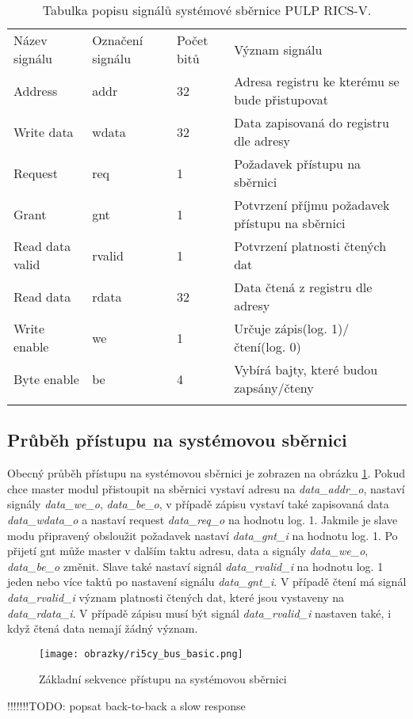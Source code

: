 \begin{table}[H]
	\FloatBarrier
  \caption{Tabulka popisu signálů systémové sběrnice PULP RICS-V. \cite{ri5cy}}
  \begin{center}
  	\small
	  \begin{tabular}{!{\vrule width 1.2pt}M{2.2cm}|M{1.5cm}|M{1.8cm}|M{7cm}!{\vrule width 1.2pt}}
	    Název signálu & Označení signálu & Počet bitů & Význam signálu\\
	    Address & addr & 32 & Adresa registru ke kterému se bude přistupovat\\
			\hline
			Write data & wdata & 32 & Data zapisovaná do registru dle adresy\\
			\hline
			Request & req & 1 & Požadavek přístupu na sběrnici\\
			\hline
			Grant & gnt & 1 & Potvrzení příjmu požadavek přístupu na sběrnici\\
			\hline			
			Read data valid & rvalid & 1 & Potvrzení platnosti čtených dat\\
			\hline
			Read data & rdata & 32 & Data čtená z registru dle adresy\\
			\hline
			Write enable & we & 1 & Určuje zápis(log. 1)/čtení(log. 0)\\
			\hline
			Byte enable & be & 4 & Vybírá bajty, které budou zapsány/čteny\\
			\hline
		\end{tabular}
  \end{center}
	\label{tab:ri5cy_bus}
\end{table}

\subsection{Průběh přístupu na systémovou sběrnici}
Obecný průběh přístupu na systémovou sběrnici je zobrazen na obrázku \ref{fig:ri5cy_bus_basic}. Pokud chce master modul přistoupit na sběrnici vystaví adresu na \textit{data\_addr\_o}, nastaví signály \textit{data\_we\_o}, \textit{data\_be\_o}, v případě zápisu vystaví také zapisovaná data \textit{data\_wdata\_o} a nastaví request \textit{data\_req\_o} na hodnotu log. 1. Jakmile je slave modu připravený obsloužit požadavek nastaví \textit{data\_gnt\_i} na hodnotu log. 1. Po přijetí gnt může master v dalším taktu adresu, data a signály \textit{data\_we\_o}, \textit{data\_be\_o} změnit. Slave také nastaví signál \textit{data\_rvalid\_i} na hodnotu log. 1 jeden nebo více taktů po nastavení signálu \textit{data\_gnt\_i}. V případě čtení má signál \textit{data\_rvalid\_i} význam platnosti čtených dat, které jsou vystaveny na \textit{data\_rdata\_i}. V případě zápisu musí být signál \textit{data\_rvalid\_i} nastaven také, i když čtená data nemají žádný význam. \cite{ri5cy}

\begin{figure}[!h]
  \begin{center}
    \texttt{[image: obrazky/ri5cy\_bus\_basic.png]}
  \end{center}
  \caption{Základní sekvence přístupu na systémovou sběrnici \cite{ri5cy}}
	\label{fig:ri5cy_bus_basic}
\end{figure}

!!!!!!!TODO: popsat back-to-back a slow response